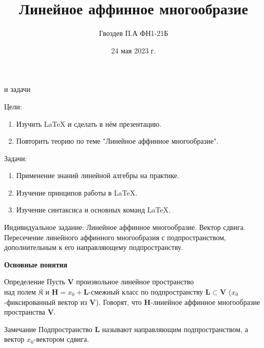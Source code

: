 \documentclass{beamer}
\title[Линейное аффинное многообразие]{\textbf{Линейное аффинное многообразие}}
\author{Гвоздев П.А ФН1-21Б}
\date{24 мая 2023 г.}
\begin{document}
\frame{\titlepage}


\begin{frame}{ и задачи}
\begin{block}{Цели:}
\begin{enumerate}
    \item Изучить LaTeX и сделать в нём презентацию.
    \item Повторить теорию по теме "Линейное аффинное многообразие".
\end{enumerate}
\end{block}
\begin{block}{Задачи:}
\begin{enumerate}
    \item Применение знаний линейной алгебры на практике.
    \item Изучение принципов работы в LaTeX.
   \item Изучение синтаксиса и основных команд LaTeX.
\end{enumerate}
\end{block}
\begin{block}{Индивидуальное задание:}
    Линейное аффинное многообразие. Вектор сдвига. Пересечение линейного аффинного многообразия с подпространством, дополнительным к его направляющему подпространству.
\end{block}
\end{frame}




\begin{frame}{\textbf{Основные понятия}}

\begin{block}{Определение}
Пусть $\mathbf{V}$ произвольное линейное пространство\\
над полем $\mathfrak{K}$ и $\mathbf{H}=x_0+\mathbf{L}$-смежный класс по подпространству $\mathbf{L}\subset \mathbf{V}$ ($x_0$-фиксированный  вектор из $\mathbf{V}$). Говорят, что $\mathbf{H}$-линейное аффинное многообразие пространства $\mathbf{V}$.
\end{block}

\begin{block}{Замечание}
Подпространство $\mathbf{L}$ называют направляющим подпространством,
а вектор $x_0$-вектором сдвига.
\end{block}


\end{frame}
\end{document}
